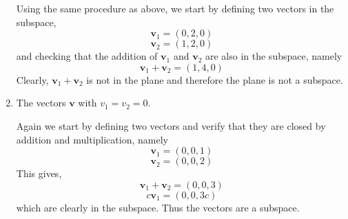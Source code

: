 \begin{enumerate}[label=(\arabic*)]
        \newline
        \begin{mdframed}[style=MyFrame]
            Using the same procedure as above, we start by defining two
            vectors in the subspace,
            \begin{equation}
                \mathbf{v}_{1} = (0,2,0)
            \end{equation}
            \begin{equation}
                \mathbf{v}_{2} = (1,2,0)
            \end{equation}
            and checking that the addition of $\mathbf{v}_{1}$ and
            $\mathbf{v}_{2}$ are also in the subspace, namely
            \begin{equation}
                \mathbf{v}_{1} + \mathbf{v}_{2} = (1,4,0)
                \label{eq:ex-a-2-1}
            \end{equation}
            Clearly, $\mathbf{v}_{1} + \mathbf{v}_{2}$ is not in the
            plane and therefore the plane is not a subspace.
        \end{mdframed}
    \item The vectors $\mathbf{v}$ with $v_{1} = v_{2} = 0$.
        \newline
        \begin{mdframed}[style=MyFrame]
            Again we start by defining two vectors and verify that they
            are closed by addition and multiplication, namely
            \begin{equation}
                \mathbf{v}_{1} = (0,0,1)
            \end{equation}
            \begin{equation}
                \mathbf{v}_{2} = (0,0,2)
            \end{equation}
            This gives,
            \begin{equation}
                \mathbf{v}_{1} + \mathbf{v}_{2} = (0,0,3)
            \end{equation}
            \begin{equation}
                c\mathbf{v}_{1} = (0,0,3c)
            \end{equation}
            which are clearly in the subspace. Thus the vectors are a
            subspace.
        \end{mdframed}

\end{enumerate}

